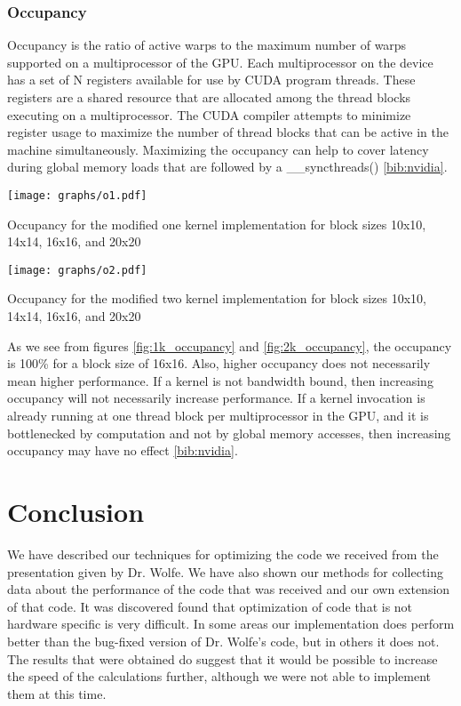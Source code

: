 \documentclass[10pt]{article}
\makeatletter
\newenvironment{figurehere}
{\def\@captype{figure}}
{}
\makeatother
\begin{document}
\begin{multicols}{2}
  \subsubsection{Occupancy}
  Occupancy is the ratio of active warps to the maximum number of warps supported on a multiprocessor of the GPU.
  Each multiprocessor on the device has a set of N registers available for use by CUDA program threads.
  These registers are a shared resource that are allocated among the thread blocks executing on a multiprocessor.
  The CUDA compiler attempts to minimize register usage to maximize the number of thread blocks that can be active in the machine simultaneously.
  Maximizing the occupancy can help to cover latency during global memory loads that are followed by a \_\_syncthreads() \ref{bib:nvidia}.

  \begin{figurehere}
    \centering
    \texttt{[image: graphs/o1.pdf]}
    \caption{Occupancy for the modified one kernel implementation for block sizes 10x10, 14x14, 16x16, and 20x20}
    \label{fig:1k_occupancy}
  \end{figurehere}

  \begin{figurehere}
    \centering
    \texttt{[image: graphs/o2.pdf]}
    \caption{Occupancy for the modified two kernel implementation for block sizes 10x10, 14x14, 16x16, and 20x20}
    \label{fig:2k_occupancy}
  \end{figurehere}

  As we see from figures \ref{fig:1k_occupancy} and \ref{fig:2k_occupancy}, the occupancy is 100\% for a block size of 16x16.
  Also, higher occupancy does not necessarily mean higher performance.
  If a kernel is not bandwidth bound, then increasing occupancy will not necessarily increase performance.
  If a kernel invocation is already running at one thread block per multiprocessor in the GPU, and it is bottlenecked by computation and not by global memory accesses, then increasing occupancy may have no effect \ref{bib:nvidia}.

  \section{Conclusion} %
  \label{sec:conclusion}
  We have described our techniques for optimizing the code we received from the presentation given by Dr. Wolfe.
  We have also shown our methods for collecting data about the performance of the code that was received and our own extension of that code.
  It was discovered found that optimization of code that is not hardware specific is very difficult.
  In some areas our implementation does perform better than the bug-fixed version of Dr. Wolfe's code, but in others it does not.
  The results that were obtained do suggest that it would be possible to increase the speed of the calculations further, although we were not able to implement them at this time.


\end{multicols}
\end{document}
